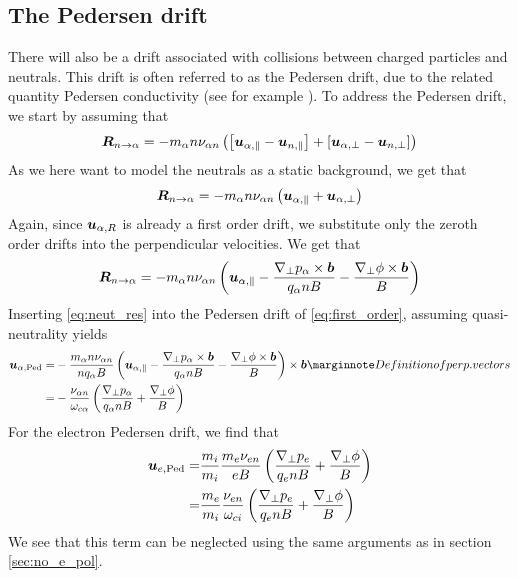 \subsection{The Pedersen drift}
%
There will also be a drift associated with collisions between charged particles and neutrals.
This drift is often referred to as the Pedersen drift, due to the related quantity Pedersen conductivity (see for example \cite{Baumjohann1997book}).
To address the Pedersen drift, we start by assuming that
%
\begin{align*}
    \boldsymbol{R}_{n\to\alpha} =
    -
     m_\alpha n \nu_{\alpha n}\left(
        \left[\boldsymbol{u}_{\alpha,\|}-\boldsymbol{u}_{n,\|} \right]
        +
        \left[\boldsymbol{u}_{\alpha,\perp}-\boldsymbol{u}_{n,\perp} \right]
        \right)
\end{align*}
%
As we here want to model the neutrals as a static background, we get that
%
\begin{align*}
    \boldsymbol{R}_{n\to\alpha} =
    -
     m_\alpha n \nu_{\alpha n}\left(
        \boldsymbol{u}_{\alpha,\|}
        +
        \boldsymbol{u}_{\alpha,\perp}
        \right)
\end{align*}
%
Again, since $\boldsymbol{u}_{\alpha,R}$ is already a first order drift, we substitute only the zeroth order drifts into the perpendicular velocities.
We get that
%
\begin{align}
    \boldsymbol{R}_{n\to\alpha} =
    - m_\alpha n \nu_{\alpha n}\left( \boldsymbol{u}_{\alpha,\|}
    - \frac{\nabla_\perp p_\alpha \times \boldsymbol{b}}{q_\alpha nB}
    - \frac{\nabla_\perp \phi \times \boldsymbol{b}}{B} \right)
    \label{eq:neut_res}
\end{align}
%
Inserting \cref{eq:neut_res} into the Pedersen drift of \cref{eq:first_order}, assuming quasi-neutrality yields
%
\begin{align*}
    \ve{u}_{\a,\text{Ped}}
    =&
    - \frac{ m_\a n \nu_{\a n} }{n q_\a B} \L( \ve{u}_{\a,\|}
    - \frac{\grad_\perp p_\a \times \ve{b}}{q_\a nB}
    - \frac{\grad_\perp \phi \times \ve{b}}{B} \R) \times\ve{b}
    \note{Definition of perp. vectors}
    \\
    =&
    - \frac{\nu_{\a n} }{\om_{c\a}}
    \L(\frac{\grad_\perp p_\a}{q_\a nB}
    + \frac{\grad_\perp \phi}{B} \R)
\end{align*}
%
For the electron Pedersen drift, we find that
%
\begin{align*}
    \boldsymbol{u}_{e,\text{Ped}}
    =&
    \frac{m_i}{m_i}\frac{ m_e \nu_{e n} }{e B}
    \left(\frac{\nabla_\perp p_e}{q_e nB}
    + \frac{\nabla_\perp \phi}{B} \right)
    \\
    =&
    \frac{m_e}{m_i}\frac{\nu_{e n} }{\omega_{ci}}
    \left(\frac{\nabla_\perp p_e}{q_e nB}
    + \frac{\nabla_\perp \phi}{B} \right)
\end{align*}
%
We see that this term can be neglected using the same arguments as in section \cref{sec:no_e_pol}.

